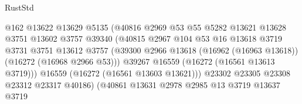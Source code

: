 \begin{lexlean}{RustStd}
\begin{coremodule}
                                          @162
                                          @13622
                                          @13629
                                          @5135
                                          (@40816
                                            @2969
                                            @53
                                            @55
                                            @5282
                                            @13621
                                            @13628
                                            @3751
                                            @13602
                                            @3757
                                            @39340
                                            (@40815
                                              @2967
                                              @104
                                              @53
                                              @16
                                              @13618
                                              @3719
                                              @3731
                                              @3751
                                              @13612
                                              @3757
                                              (@39300
                                                @2966
                                                @13618
                                                (@16962 (@16963 @13618))
                                                (@16272 (@16968 @2966 @53)))
                                              @39267
                                              @16559
                                              (@16272 (@16561 @13613 @3719)))
                                            @16559
                                            (@16272 (@16561 @13603 @13621)))
                                          @23302
                                          @23305
                                          @23308
                                          @23312
                                          @23317
                                          @40186)
                                        (@40861
                                          @13631
                                          @2978
                                          @2985
                                          @13
                                          @3719
                                          @13637
                                          @3719

\end{coremodule}
\end{lexlean}
